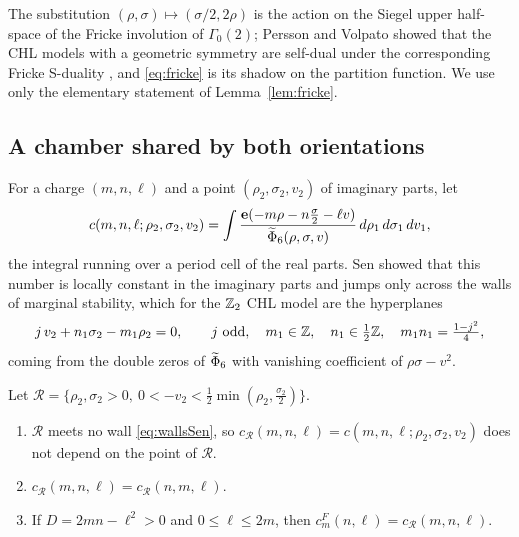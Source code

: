\begin{remark}
The substitution $(\rho,\sigma)\mapsto(\sigma/2,2\rho)$ is the action on the Siegel upper half-space of the Fricke involution of $\Gamma_0(2)$; Persson and Volpato showed that the CHL models with a geometric symmetry are self-dual under the corresponding Fricke S-duality \cite{PV15}, and \eqref{eq:fricke} is its shadow on the partition function. We use only the elementary statement of Lemma~\ref{lem:fricke}.
\end{remark}

\subsection{A chamber shared by both orientations}
For a charge $(m,n,\ell)$ and a point $(\rho_2,\sigma_2,v_2)$ of imaginary parts, let
\[
c(m,n,\ell;\rho_2,\sigma_2,v_2)=\int\frac{\mathbf e(-m\rho-n\frac\sigma2-\ell v)}{\widetilde\Phi_6(\rho,\sigma,v)}\,d\rho_1\,d\sigma_1\,dv_1,
\]
the integral running over a period cell of the real parts. Sen showed \cite[\S4]{Sen07} that this number is locally constant in the imaginary parts and jumps only across the walls of marginal stability, which for the $\mathbb{Z}_2$ CHL model are the hyperplanes
\begin{equation}\label{eq:wallsSen}
j\,v_2+n_1\sigma_2-m_1\rho_2=0,\qquad j\ \text{odd},\quad m_1\in\mathbb{Z},\quad n_1\in\tfrac12\mathbb{Z},\quad m_1n_1=\tfrac{1-j^2}4,
\end{equation}
coming from the double zeros of $\widetilde\Phi_6$ with vanishing coefficient of $\rho\sigma-v^2$.

\begin{lemma}\label{lem:chamber}
Let $\mathcal R=\{\rho_2,\sigma_2>0,\ 0<-v_2<\frac12\min(\rho_2,\frac{\sigma_2}2)\}$.
\begin{enumerate}
\item[(i)] $\mathcal R$ meets no wall \eqref{eq:wallsSen}, so $c_{\mathcal R}(m,n,\ell)=c(m,n,\ell;\rho_2,\sigma_2,v_2)$ does not depend on the point of $\mathcal R$.
\item[(ii)] $c_{\mathcal R}(m,n,\ell)=c_{\mathcal R}(n,m,\ell)$.
\item[(iii)] If $D=2mn-\ell^2>0$ and $0\le\ell\le2m$, then $c^F_m(n,\ell)=c_{\mathcal R}(m,n,\ell)$.
\end{enumerate}
\end{lemma}


